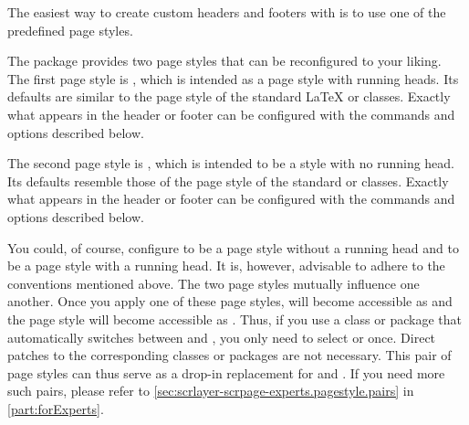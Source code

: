 The easiest way to create custom headers and footers with
 is to use one of the predefined page styles.
%
\iffalse %
  This section introduces the page styles defined by the
  \Package{scrlayer-scrpage} package as it loads. It also explains the
  commands that can be used to create basic settings for these page
  styles. Further options, commands, and background information can be found
  in the following sections and in
  \autoref{sec:scrlayer-scrpage-experts.pagestyle.pairs} in
  \autoref{part:forExperts}.%
\fi

\begin{Declaration}
\end{Declaration}
The  package provides two page styles that can be
reconfigured to your liking. The first page style is
, which is intended
as a page style with running heads. Its defaults are similar to the page style
 of the standard \LaTeX{} or
\KOMAScript{} classes. Exactly what appears in the header or footer can be
configured with the commands and options described below.

The second page style is %
, which is intended to be a style
with no running head. Its defaults resemble those of the
 page style of the standard or
\KOMAScript{} classes. Exactly what appears in the header or footer can be
configured with the commands and options described below.

You could, of course, configure  to be a page style
without a running head and  to be a page style
with a running head. It is, however, advisable to adhere to the conventions
mentioned above. The two page styles mutually influence one another. Once you
apply one of these page styles,  will become accessible
as %
 and the page style 
will become accessible as %
. Thus, if you use a class or package that automatically
switches between  and , you only need to
select  or  once. Direct
patches to the corresponding classes or packages are not necessary. This pair
of page styles can thus serve as a drop-in replacement for
 and . If you need more such pairs,
please refer to \autoref{sec:scrlayer-scrpage-experts.pagestyle.pairs} in
\autoref{part:forExperts}.%
\EndIndexGroup


